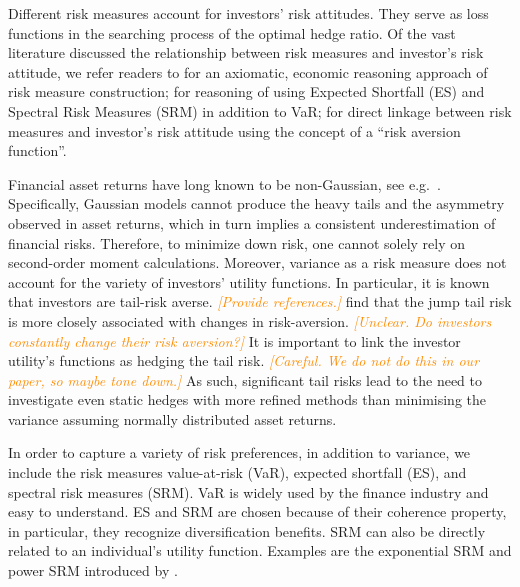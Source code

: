 \documentclass[11pt,a4paper,english]{article}
\providecommand{\natp}[1]{\textcolor{darkorange}{#1}}
\begin{document}
Different risk measures account for investors' risk attitudes.
They serve as loss functions in the searching process of the optimal
hedge ratio. Of the vast literature discussed the relationship between
risk measures and investor's risk attitude, we refer readers to
\citet{artzner1999coherent} for an axiomatic, economic reasoning
approach of risk measure construction;
\citet{embrechts2002correlation} for reasoning of using Expected
Shortfall (ES) and Spectral Risk Measures (SRM) in addition to VaR;
\citet{Acerbi2002} for direct linkage between risk measures and
investor's risk attitude using the concept of a ``risk aversion
function''.  

Financial asset returns have long known to be non-Gaussian, see e.g.\
\citep{fama1963mandelbrot,Cont2001}. Specifically, Gaussian models
cannot produce the heavy tails and the asymmetry observed in 
asset returns, which in turn implies a consistent underestimation of
financial risks. 
Therefore, to minimize down risk, one cannot solely rely on
second-order moment calculations. Moreover, variance as a risk measure
does not account for the variety of investors' utility functions. In
particular, it is known that  
investors are tail-risk averse. \natp{\em [Provide references.]}
\citet{bollerslev2015tail} find that the jump tail risk is more
closely associated with changes in risk-aversion. \natp{\em
  [Unclear. Do investors constantly change their risk aversion?]}
It is important to link the investor utility's functions as hedging
the tail risk. \natp{\em [Careful. We do not do this in our paper, so
  maybe tone down.]}
As such, significant tail risks lead to the need to investigate even
static hedges with more refined methods than minimising the variance
assuming normally distributed asset
returns\citep{ederington2008minimum}.

In order to capture a variety of risk preferences, in addition to
variance, we include the risk measures value-at-risk (VaR), expected
shortfall (ES), and spectral risk measures (SRM). 
VaR is widely used by the finance industry and easy to understand. 
ES and SRM are chosen because of their coherence property, in
particular, they recognize diversification benefits.
SRM can also be directly related to an individual's utility function.
Examples are the exponential SRM and power SRM introduced by
\citet{dowd2008spectral}.
\end{document}
